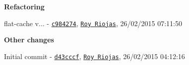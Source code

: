 \begin{DoxyItemize}
\item {\bfseries Refactoring}
\begin{DoxyItemize}
\item flat-\/cache v... -\/ \href{https://github.com/royriojas/flat-cache/commit/c984274}{\tt c984274}, \href{https://github.com/Roy Riojas}{\tt Roy Riojas}, 26/02/2015 07\+:11\+:50
\end{DoxyItemize}
\item {\bfseries Other changes}
\begin{DoxyItemize}
\item Initial commit -\/ \href{https://github.com/royriojas/flat-cache/commit/d43cccf}{\tt d43cccf}, \href{https://github.com/Roy Riojas}{\tt Roy Riojas}, 26/02/2015 04\+:12\+:16 
\end{DoxyItemize}
\end{DoxyItemize}